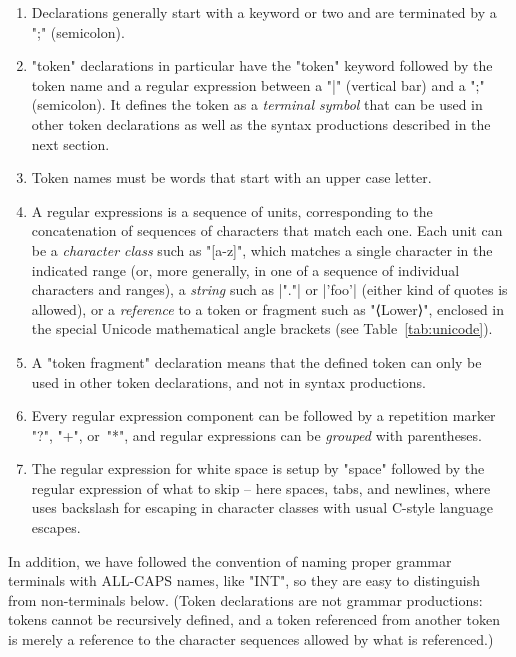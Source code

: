 \documentclass[11pt]{article} %
\begin{document}
\begin{notation}\leavevmode
  \begin{enumerate}

  \item Declarations generally start with a keyword or two and are terminated by a ";" (semicolon).

  \item "token" declarations in particular have the "token" keyword followed by the token name and a
    regular expression between a "|" (vertical bar) and a ";" (semicolon). It defines the token as a
    \emph{terminal symbol} that can be used in other token declarations as well as the syntax
    productions described in the next section.

  \item Token names must be words that start with an upper case letter.

  \item A regular expressions is a sequence of units, corresponding to the concatenation of
    sequences of characters that match each one.  Each unit can be a \emph{character class} such as
    "[a-z]", which matches a single character in the indicated range (or, more generally, in one of
    a sequence of individual characters and ranges), a \emph{string} such as \hacsc|"."| or
    \hacsc|'foo'| (either kind of quotes is allowed), or a \emph{reference} to a token or fragment
    such as "⟨Lower⟩", enclosed in the special Unicode mathematical angle brackets (see
    Table~\ref{tab:unicode}).

  \item A "token fragment" declaration means that the defined token can only be used in other token
    declarations, and not in syntax productions.

  \item Every regular expression component can be followed by a repetition marker "?", "+", or~"*",
    and regular expressions can be \emph{grouped} with parentheses.

  \item The regular expression for white space is setup by "space" followed by the regular
    expression of what to skip -- here spaces, tabs, and newlines, where \HAX uses backslash for
    escaping in character classes with usual C-style language escapes.

  \end{enumerate}
  In addition, we have followed the convention of naming proper grammar terminals with ALL-CAPS
  names, like "INT", so they are easy to distinguish from non-terminals below. (Token declarations
  are not grammar productions: tokens cannot be recursively defined, and a token referenced from
  another token is merely a reference to the character sequences allowed by what is referenced.)
\end{notation}
\end{document}
